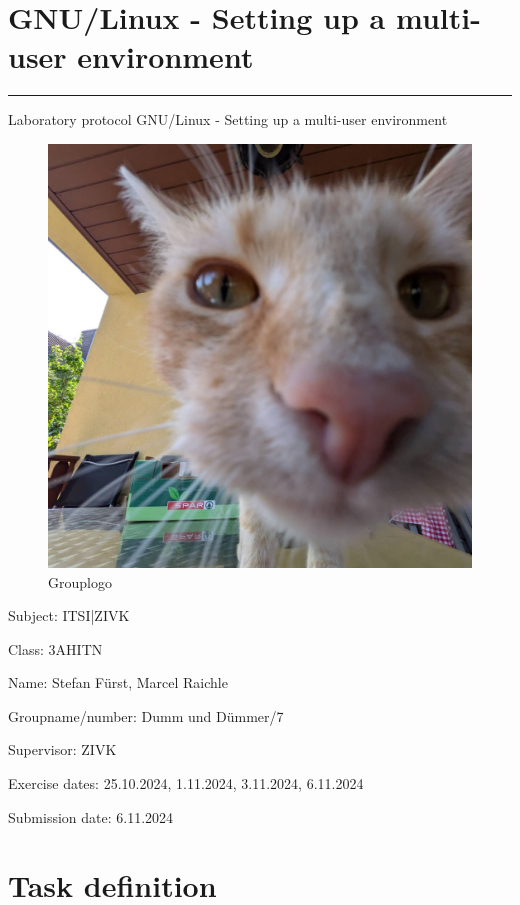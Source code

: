 \documentclass[a4paper]{article}
\begin{document}

\pagestyle{oida}
\section*{GNU/Linux - Setting up a multi-user environment}
\par\noindent\rule{\textwidth}{0.4pt}

Laboratory protocol
GNU/Linux - Setting up a multi-user environment

\begin{figure}[h]
	\includegraphics[scale=0.3]{images/mika.jpeg}
	\caption{Grouplogo}
\end{figure}

\vspace*{\fill}
Subject:	ITSI|ZIVK

Class:	3AHITN

Name:	Stefan Fürst, Marcel Raichle

Groupname/number: Dumm und Dümmer/7

Supervisor: 	ZIVK

Exercise dates:	25.10.2024, 1.11.2024, 3.11.2024, 6.11.2024

Submission date: 6.11.2024


\newpage
\tableofcontents

\newpage

\section{Task definition}
\end{document}
